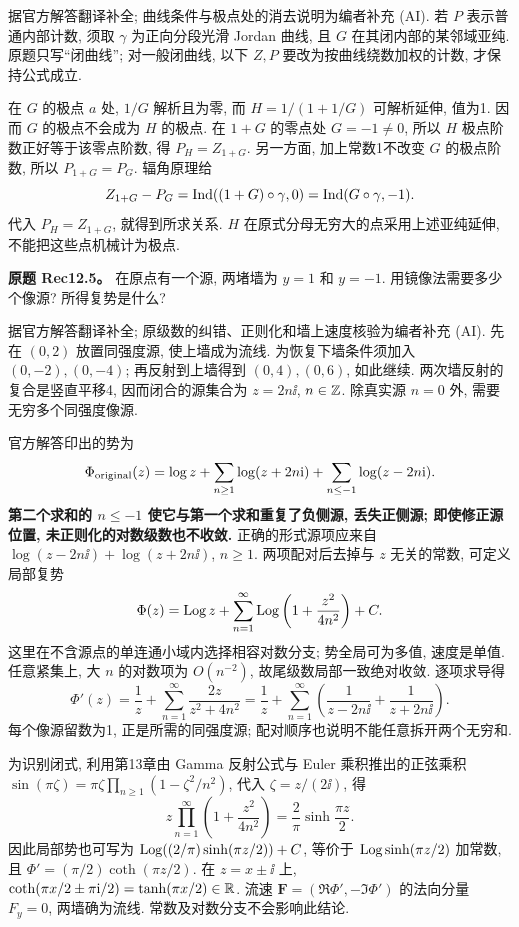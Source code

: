 \begin{solution}
据官方解答翻译补全; 曲线条件与极点处的消去说明为编者补充 (AI). 若 $P$ 表示普通内部计数, 须取 $\gamma$ 为正向分段光滑 Jordan 曲线, 且 $G$ 在其闭内部的某邻域亚纯. 原题只写“闭曲线”; 对一般闭曲线, 以下 $Z,P$ 要改为按曲线绕数加权的计数, 才保持公式成立.

在 $G$ 的极点 $a$ 处, $1/G$ 解析且为零, 而 $H=1/(1+1/G)$ 可解析延伸, 值为1. 因而 $G$ 的极点不会成为 $H$ 的极点. 在 $1+G$ 的零点处 $G=-1\ne0$, 所以 $H$ 极点阶数正好等于该零点阶数, 得 $P_H=Z_{1+G}$. 另一方面, 加上常数1不改变 $G$ 的极点阶数, 所以 $P_{1+G}=P_G$. 辐角原理给
\[
Z_{1+G}-P_G=\operatorname{Ind}((1+G)\circ\gamma,0)=\operatorname{Ind}(G\circ\gamma,-1).
\]
代入 $P_H=Z_{1+G}$, 就得到所求关系. $H$ 在原式分母无穷大的点采用上述亚纯延伸, 不能把这些点机械计为极点.
\end{solution}
\begin{exercise}
\textbf{原题 Rec12.5。}\label{ass:rec12-5}
在原点有一个源, 两堵墙为 $y=1$ 和 $y=-1$. 用镜像法需要多少个像源? 所得复势是什么?
\end{exercise}
\begin{solution}
据官方解答翻译补全; 原级数的纠错、正则化和墙上速度核验为编者补充 (AI). 先在 $(0,2)$ 放置同强度源, 使上墙成为流线. 为恢复下墙条件须加入 $(0,-2),(0,-4)$; 再反射到上墙得到 $(0,4),(0,6)$, 如此继续. 两次墙反射的复合是竖直平移4, 因而闭合的源集合为 $z=2n\ii$, $n\in\mathbb Z$. 除真实源 $n=0$ 外, 需要无穷多个同强度像源.

官方解答印出的势为
\[
\Phi_{\rm original}(z)=\log z+\sum_{n\ge1}\log(z+2n\mathrm i)+\sum_{n\le-1}\log(z-2n\mathrm i).
\]
\textbf{第二个求和的 $n\le-1$ 使它与第一个求和重复了负侧源, 丢失正侧源; 即使修正源位置, 未正则化的对数级数也不收敛.} 正确的形式源项应来自 $\log(z-2n\ii)+\log(z+2n\ii)$, $n\ge1$. 两项配对后去掉与 $z$ 无关的常数, 可定义局部复势
\[
\Phi(z)=\operatorname{Log} z+\sum_{n=1}^\infty\operatorname{Log}\left(1+\frac{z^2}{4n^2}\right)+C.
\]
这里在不含源点的单连通小域内选择相容对数分支; 势全局可为多值, 速度是单值. 任意紧集上, 大 $n$ 的对数项为 $O(n^{-2})$, 故尾级数局部一致绝对收敛. 逐项求导得
\[
\Phi'(z)=\frac1z+\sum_{n=1}^\infty\frac{2z}{z^2+4n^2}
=\frac1z+\sum_{n=1}^\infty\left(\frac1{z-2n\ii}+\frac1{z+2n\ii}\right).
\]
每个像源留数为1, 正是所需的同强度源; 配对顺序也说明不能任意拆开两个无穷和.

为识别闭式, 利用第13章由 Gamma 反射公式与 Euler 乘积推出的正弦乘积 $\sin(\pi\zeta)=\pi\zeta\prod_{n\ge1}(1-\zeta^2/n^2)$, 代入 $\zeta=z/(2\ii)$, 得
\[
z\prod_{n=1}^\infty\left(1+\frac{z^2}{4n^2}\right)=\frac2\pi\sinh\frac{\pi z}2.
\]
因此局部势也可写为 $\operatorname{Log}((2/\pi)\sinh(\pi z/2))+C$, 等价于 $\operatorname{Log}\sinh(\pi z/2)$ 加常数, 且 $\Phi'=(\pi/2)\coth(\pi z/2)$. 在 $z=x\pm\ii$ 上, $\coth(\pi x/2\pm\pi\mathrm i/2)=\tanh(\pi x/2)\in\mathbb R$. 流速 $\mathbf F=(\Re\Phi',-\Im\Phi')$ 的法向分量 $F_y=0$, 两墙确为流线. 常数及对数分支不会影响此结论.

\end{solution}
